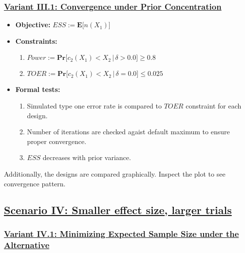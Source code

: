 \documentclass[]{book}
\providecommand{\tightlist}{%
  \setlength{\itemsep}{0pt}\setlength{\parskip}{0pt}}
\begin{document}
\hypertarget{variant-iii.1-convergence-under-prior-concentration}{%
\subsubsection{\texorpdfstring{\protect\hyperlink{variantIII_1}{Variant III.1: Convergence under Prior Concentration}}{Variant III.1: Convergence under Prior Concentration}}\label{variant-iii.1-convergence-under-prior-concentration}}

\begin{itemize}
\tightlist
\item
  \textbf{Objective:} \(ESS := \boldsymbol{E}\big[n(X_1)\big]\)
\item
  \textbf{Constraints:}

  \begin{enumerate}
  \def\labelenumi{\arabic{enumi}.}
  \tightlist
  \item
    \(Power := \boldsymbol{Pr}\big[c_2(X_1) < X_2\,|\,\delta>0.0\big] \geq 0.8\)
  \item
    \(TOER := \boldsymbol{Pr}\big[c_2(X_1) < X_2\,|\,\delta=0.0\big] \leq 0.025\)
  \end{enumerate}
\item
  \textbf{Formal tests:}

  \begin{enumerate}
  \def\labelenumi{\arabic{enumi}.}
  \tightlist
  \item
    Simulated type one error rate is compared to \(TOER\) constraint for each
    design.
  \item
    Number of iterations are checked agaist default maximum to ensure proper
    convergence.
  \item
    \(ESS\) decreases with prior variance.
  \end{enumerate}
\end{itemize}

Additionally, the designs are compared graphically.
Inspect the plot to see convergence pattern.

\hypertarget{scenario-iv-smaller-effect-size-larger-trials}{%
\subsection{\texorpdfstring{\protect\hyperlink{scenarioIV}{Scenario IV: Smaller effect size, larger trials}}{Scenario IV: Smaller effect size, larger trials}}\label{scenario-iv-smaller-effect-size-larger-trials}}

\hypertarget{variant-iv.1-minimizing-expected-sample-size-under-the-alternative}{%
\subsubsection{\texorpdfstring{\protect\hyperlink{variantIV_1}{Variant IV.1: Minimizing Expected Sample Size under the Alternative}}{Variant IV.1: Minimizing Expected Sample Size under the Alternative}}\label{variant-iv.1-minimizing-expected-sample-size-under-the-alternative}}
\end{document}
